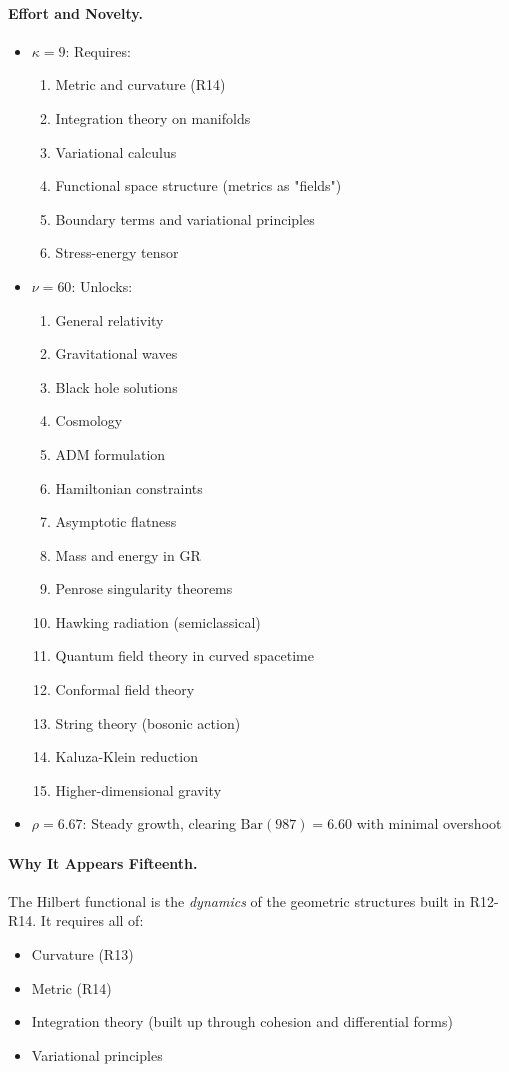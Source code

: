 \documentclass[11pt]{article}
\theoremstyle{definition}
\begin{document}
\paragraph{Effort and Novelty.}
\begin{itemize}
\item $\kappa = 9$: Requires:
\begin{enumerate}
\item Metric and curvature (R14)
\item Integration theory on manifolds
\item Variational calculus
\item Functional space structure (metrics as "fields")
\item Boundary terms and variational principles
\item Stress-energy tensor
\end{enumerate}
\item $\nu = 60$: Unlocks:
\begin{enumerate}
\item General relativity
\item Gravitational waves
\item Black hole solutions
\item Cosmology
\item ADM formulation
\item Hamiltonian constraints
\item Asymptotic flatness
\item Mass and energy in GR
\item Penrose singularity theorems
\item Hawking radiation (semiclassical)
\item Quantum field theory in curved spacetime
\item Conformal field theory
\item String theory (bosonic action)
\item Kaluza-Klein reduction
\item Higher-dimensional gravity
\end{enumerate}
\item $\rho = 6.67$: Steady growth, clearing $\text{Bar}(987) = 6.60$ with minimal overshoot
\end{itemize}

\paragraph{Why It Appears Fifteenth.}
The Hilbert functional is the \emph{dynamics} of the geometric structures built in R12-R14. It requires all of:
\begin{itemize}
\item Curvature (R13)
\item Metric (R14)  
\item Integration theory (built up through cohesion and differential forms)
\item Variational principles
\end{itemize}
\end{document}
